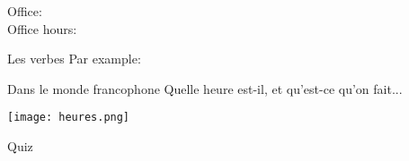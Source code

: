 \documentclass{beamer}
\subtitle[Heures et verbes \lexi{-ir}]{Les heures et les verbes \lexi{-ir}}
\begin{document}
  \begin{frame}
    \titlepage
    \tiny{Office: \\
          Office hours: }
  \end{frame}

  \begin{frame}{Les verbes }
    Par example:
    \begin{center}
      
    \end{center}
  \end{frame}

  \begin{frame}{Dans le monde francophone}
    Quelle heure est-il, et qu'est-ce qu'on fait...
    \begin{center}
      \texttt{[image: heures.png]}
    \end{center}
  \end{frame}

  \begin{frame}{}
    \begin{center}
      \Large Quiz
    \end{center}
  \end{frame}
\end{document}
